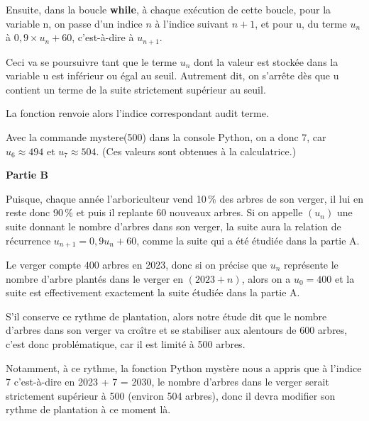 \begin{enumerate}
Ensuite, dans la boucle \textbf{while}, à chaque exécution de cette boucle, pour la variable n, on passe d'un indice $n$ à l'indice suivant $n + 1$, et pour u, du terme $u_n$ à $0,9\times u_n + 60$, c'est-à-dire à $u_{n+1}$.

Ceci va se poursuivre tant que le terme $u_n$ dont la valeur est stockée dans la variable u est inférieur ou égal au seuil. Autrement dit, on s'arrête dès que u contient un terme de la suite strictement supérieur au seuil.

La fonction renvoie alors l'indice correspondant audit terme.

Avec la commande mystere(500) dans la console Python, on a donc 7, car $u_6 \approx 494$ et $u_7 \approx 504$. (Ces valeurs sont obtenues à la calculatrice.)
	\end{enumerate}

	\medskip

	\textbf{Partie B}

	\medskip



Puisque, chaque année l'arboriculteur vend 10\,\% des arbres de son verger, il lui en reste donc 90\,\% et puis il replante $60$ nouveaux arbres. Si on appelle $(u_n)$ une suite donnant le nombre d'arbres dans son verger, la suite aura la relation de récurrence $u_{n+1} = 0,9u_n + 60$, comme la suite qui a été étudiée dans la partie A.

Le verger compte $400$ arbres en 2023, donc si on précise que $u_n$ représente le nombre d'arbre plantés dans le verger en $(2023 + n)$, alors on a $u_0 = 400$ et la suite est effectivement exactement la suite étudiée dans la partie A.

S'il conserve ce rythme de plantation, alors notre étude dit que le nombre d'arbres dans son verger va croître et se stabiliser aux alentours de 600 arbres, c'est donc problématique, car il est limité à 500 arbres.

	Notamment, à ce rythme, la fonction Python mystère nous a appris que à l'indice 7 c'est-à-dire en 2023 + 7 = 2030, le nombre d'arbres dans le verger serait strictement supérieur à 500 (environ 504 arbres), donc il devra modifier son rythme de plantation à ce moment là.

\bigskip

